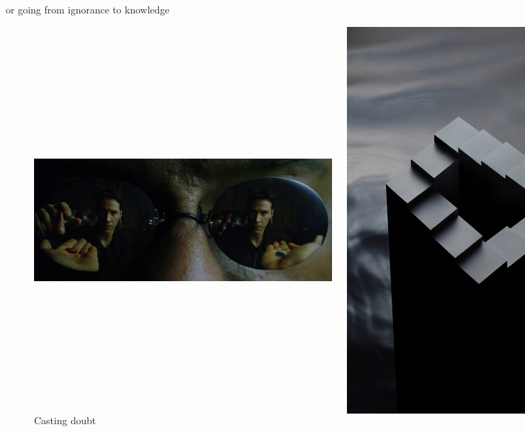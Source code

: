 \documentclass[xcolor=dvipsnames]{beamer}
\begin{document}
\begin{frame}{or going from ignorance to knowledge}
\begin{figure}
  \centering
  \begin{columns}
    \centering
    \caption {Change of mind}
    \includegraphics[width=0.99\textwidth]{pills}
    \centering
    \caption {Casting doubt}
    \includegraphics[width=0.99\textwidth]{stairs}
  \end{columns}
\end{figure}
\end{frame}
\end{document}
